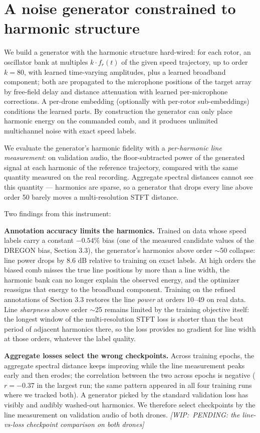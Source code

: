 \documentclass[journal]{IEEEtran}
\newcommand{\wip}[1]{{\color{gray!70!black}\textit{[WIP:~#1]}}}
\begin{document}
\section{A noise generator constrained to harmonic structure}
\label{sec:generator}

We build a generator with the harmonic structure hard-wired: for each rotor,
an oscillator bank at multiples $k \cdot f_r(t)$ of the given speed
trajectory, up to order $k = 80$, with learned time-varying amplitudes, plus
a learned broadband component; both are propagated to the microphone
positions of the target array by free-field delay and distance attenuation
with learned per-microphone corrections. A per-drone embedding (optionally
with per-rotor sub-embeddings) conditions the learned parts. By construction
the generator can only place harmonic energy on the commanded comb, and it
produces unlimited multichannel noise with exact speed labels.

We evaluate the generator's harmonic fidelity with a \emph{per-harmonic line
measurement}: on validation audio, the floor-subtracted power of the
generated signal at each harmonic of the reference trajectory, compared with
the same quantity measured on the real recording. Aggregate spectral
distances cannot see this quantity --- harmonics are sparse, so a generator
that drops every line above order 50 barely moves a multi-resolution STFT
distance.

Two findings from this instrument:

\textbf{Annotation accuracy limits the harmonics.} Trained on data whose speed
labels carry a constant $-0.54\%$ bias (one of the measured candidate values
of the DREGON bias, Section 3.3), the generator's harmonics above order
$\sim$50 collapse: line power drops by 8.6 dB relative to training on exact
labels. At high orders the biased comb misses the true line positions by more
than a line width, the harmonic bank can no longer explain the observed
energy, and the optimizer reassigns that energy to the broadband component.
Training on the refined annotations of Section 3.3 restores the line
\emph{power} at orders 10--49 on real data. Line \emph{sharpness} above order
$\sim$25 remains limited by the training objective itself: the longest window
of the multi-resolution STFT loss is shorter than the beat period of adjacent
harmonics there, so the loss provides no gradient for line width at those
orders, whatever the label quality.

\textbf{Aggregate losses select the wrong checkpoints.} Across training
epochs, the aggregate spectral distance keeps improving while the line
measurement peaks early and then erodes; the correlation between the two
across epochs is negative ($r = -0.37$ in the largest run; the same pattern
appeared in all four training runs where we tracked both). A generator picked
by the standard validation loss has visibly and audibly washed-out harmonics.
We therefore select checkpoints by the line measurement on validation audio
of both drones. \wip{PENDING: the line-vs-loss checkpoint comparison on both
drones}
\end{document}
